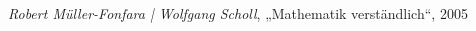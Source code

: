 \begin{thebibliography}{1000}

        \textit{Robert Müller-Fonfara | Wolfgang Scholl},
        „Mathematik verständlich“, 2005

\end{thebibliography}